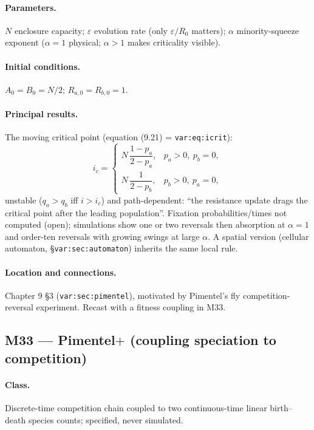 \documentclass[11pt,a4paper]{article}
\begin{document}
\paragraph{Parameters.} $N$ enclosure capacity; $\varepsilon$ evolution
rate (only $\varepsilon/R_0$ matters); $\alpha$ minority-squeeze exponent
($\alpha=1$ physical; $\alpha>1$ makes criticality visible).

\paragraph{Initial conditions.} $A_0=B_0=N/2$; $R_{a,0}=R_{b,0}=1$.

\paragraph{Principal results.} The moving critical point (equation (9.21)
= \texttt{var:eq:icrit}):
\[
i_c=\begin{cases}
N\,\dfrac{1-p_a}{2-p_a}, & p_a>0,\ p_b=0,\\[6pt]
N\,\dfrac{1}{2-p_b}, & p_b>0,\ p_a=0,
\end{cases}
\]
unstable ($q_a>q_b$ iff $i>i_c$) and path-dependent: ``the resistance
update drags the critical point after the leading population''. Fixation
probabilities/times not computed (open); simulations show one or two
reversals then absorption at $\alpha=1$ and order-ten reversals with
growing swings at large $\alpha$. A spatial version (cellular automaton,
\S\texttt{var:sec:automaton}) inherits the same local rule.

\paragraph{Location and connections.} Chapter 9 \S3
(\texttt{var:sec:pimentel}), motivated by Pimentel's fly
competition-reversal experiment. Recast with a fitness coupling in M33.

\subsection{M33 --- Pimentel$+$ (coupling speciation to competition) \quad [specification]}

\paragraph{Class.} Discrete-time competition chain coupled to two
continuous-time linear birth--death species counts; specified, never
simulated.
\end{document}
